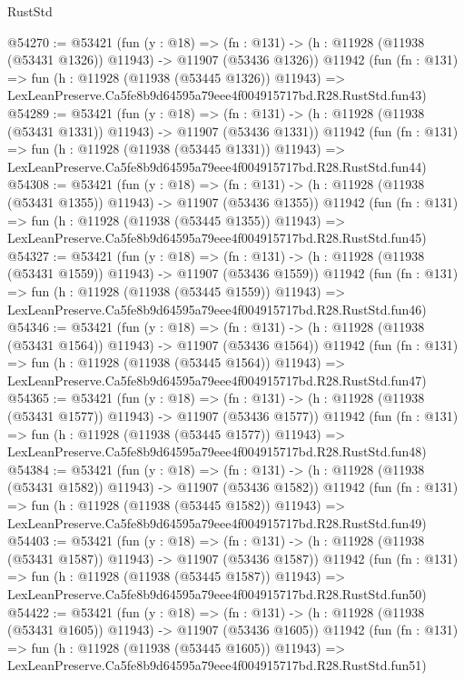\begin{lexlean}{RustStd}
\begin{coremodule}
@54270 := @53421
    (fun (y : @18) =>
    (fn : @131) -> (h : @11928 (@11938 (@53431 @1326)) @11943) -> @11907 (@53436 @1326))
    @11942
    (fun (fn : @131) =>
    fun (h : @11928 (@11938 (@53445 @1326)) @11943) =>
    LexLeanPreserve.Ca5fe8b9d64595a79eee4f004915717bd.R28.RustStd.fun43)
@54289 := @53421
    (fun (y : @18) =>
    (fn : @131) -> (h : @11928 (@11938 (@53431 @1331)) @11943) -> @11907 (@53436 @1331))
    @11942
    (fun (fn : @131) =>
    fun (h : @11928 (@11938 (@53445 @1331)) @11943) =>
    LexLeanPreserve.Ca5fe8b9d64595a79eee4f004915717bd.R28.RustStd.fun44)
@54308 := @53421
    (fun (y : @18) =>
    (fn : @131) -> (h : @11928 (@11938 (@53431 @1355)) @11943) -> @11907 (@53436 @1355))
    @11942
    (fun (fn : @131) =>
    fun (h : @11928 (@11938 (@53445 @1355)) @11943) =>
    LexLeanPreserve.Ca5fe8b9d64595a79eee4f004915717bd.R28.RustStd.fun45)
@54327 := @53421
    (fun (y : @18) =>
    (fn : @131) -> (h : @11928 (@11938 (@53431 @1559)) @11943) -> @11907 (@53436 @1559))
    @11942
    (fun (fn : @131) =>
    fun (h : @11928 (@11938 (@53445 @1559)) @11943) =>
    LexLeanPreserve.Ca5fe8b9d64595a79eee4f004915717bd.R28.RustStd.fun46)
@54346 := @53421
    (fun (y : @18) =>
    (fn : @131) -> (h : @11928 (@11938 (@53431 @1564)) @11943) -> @11907 (@53436 @1564))
    @11942
    (fun (fn : @131) =>
    fun (h : @11928 (@11938 (@53445 @1564)) @11943) =>
    LexLeanPreserve.Ca5fe8b9d64595a79eee4f004915717bd.R28.RustStd.fun47)
@54365 := @53421
    (fun (y : @18) =>
    (fn : @131) -> (h : @11928 (@11938 (@53431 @1577)) @11943) -> @11907 (@53436 @1577))
    @11942
    (fun (fn : @131) =>
    fun (h : @11928 (@11938 (@53445 @1577)) @11943) =>
    LexLeanPreserve.Ca5fe8b9d64595a79eee4f004915717bd.R28.RustStd.fun48)
@54384 := @53421
    (fun (y : @18) =>
    (fn : @131) -> (h : @11928 (@11938 (@53431 @1582)) @11943) -> @11907 (@53436 @1582))
    @11942
    (fun (fn : @131) =>
    fun (h : @11928 (@11938 (@53445 @1582)) @11943) =>
    LexLeanPreserve.Ca5fe8b9d64595a79eee4f004915717bd.R28.RustStd.fun49)
@54403 := @53421
    (fun (y : @18) =>
    (fn : @131) -> (h : @11928 (@11938 (@53431 @1587)) @11943) -> @11907 (@53436 @1587))
    @11942
    (fun (fn : @131) =>
    fun (h : @11928 (@11938 (@53445 @1587)) @11943) =>
    LexLeanPreserve.Ca5fe8b9d64595a79eee4f004915717bd.R28.RustStd.fun50)
@54422 := @53421
    (fun (y : @18) =>
    (fn : @131) -> (h : @11928 (@11938 (@53431 @1605)) @11943) -> @11907 (@53436 @1605))
    @11942
    (fun (fn : @131) =>
    fun (h : @11928 (@11938 (@53445 @1605)) @11943) =>
    LexLeanPreserve.Ca5fe8b9d64595a79eee4f004915717bd.R28.RustStd.fun51)

\end{coremodule}
\end{lexlean}
